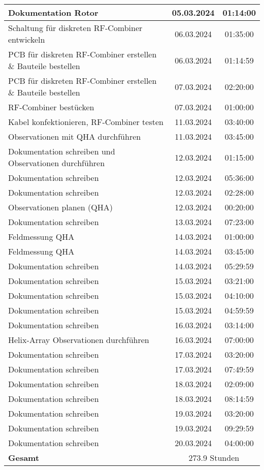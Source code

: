 \begin{longtable}{|l|c|c|}
	\hline
	Dokumentation Rotor & 05.03.2024 & 01:14:00 \\
	\hline
	Schaltung für diskreten RF-Combiner entwickeln  & 06.03.2024 & 01:35:00 \\
	\hline
	PCB für diskreten RF-Combiner erstellen \& Bauteile bestellen & 06.03.2024 & 01:14:59 \\
	\hline
	PCB für diskreten RF-Combiner erstellen \& Bauteile bestellen & 07.03.2024 & 02:20:00 \\
	\hline
	RF-Combiner bestücken & 07.03.2024 & 01:00:00 \\
	\hline
	Kabel konfektionieren, RF-Combiner testen & 11.03.2024 & 03:40:00 \\
	\hline
	Observationen mit QHA durchführen & 11.03.2024 & 03:45:00 \\
	\hline
	Dokumentation schreiben und Observationen durchführen & 12.03.2024 & 01:15:00 \\
	\hline
	Dokumentation schreiben & 12.03.2024 & 05:36:00 \\
	\hline
	Dokumentation schreiben & 12.03.2024 & 02:28:00 \\
	\hline
	Observationen planen (QHA) & 12.03.2024 & 00:20:00 \\
	\hline
	Dokumentation schreiben & 13.03.2024 & 07:23:00 \\
	\hline
	Feldmessung QHA & 14.03.2024 & 01:00:00 \\
	\hline
	Feldmessung QHA & 14.03.2024 & 03:45:00 \\
	\hline
	Dokumentation schreiben & 14.03.2024 & 05:29:59 \\
	\hline
	Dokumentation schreiben & 15.03.2024 & 03:21:00 \\
	\hline
	Dokumentation schreiben & 15.03.2024 & 04:10:00 \\
	\hline
	Dokumentation schreiben & 15.03.2024 & 04:59:59 \\
	\hline
	Dokumentation schreiben & 16.03.2024 & 03:14:00 \\
	\hline
	Helix-Array Observationen durchführen & 16.03.2024 & 07:00:00 \\
	\hline
	Dokumentation schreiben & 17.03.2024 & 03:20:00 \\
	\hline
	Dokumentation schreiben & 17.03.2024 & 07:49:59 \\
	\hline
	Dokumentation schreiben & 18.03.2024 & 02:09:00 \\
	\hline
	Dokumentation schreiben & 18.03.2024 & 08:14:59 \\
	\hline
	Dokumentation schreiben & 19.03.2024 & 03:20:00 \\
	\hline
	Dokumentation schreiben & 19.03.2024 & 09:29:59 \\
	\hline
	Dokumentation schreiben & 20.03.2024 & 04:00:00 \\
	\hhline{|===|}
	\textbf{Gesamt} & \multicolumn{2}{c|}{273.9 Stunden} \\
	\hline
\end{longtable}
